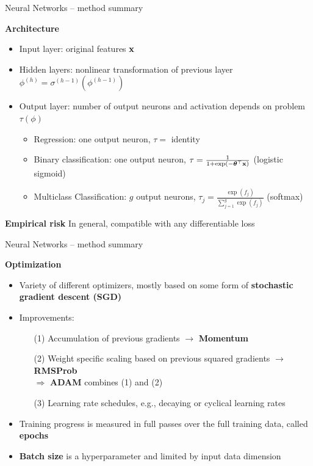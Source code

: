 \documentclass[11pt,compress,t,notes=noshow, xcolor=table]{beamer}
\newcommand{\highlight}[1]{\textcolor{hlcol}{\textbf{#1}}}
\begin{document}
\begin{frame2}{Neural Networks -- method summary}

  \footnotesize

  \highlight{Architecture}
  
  \begin{itemize}
      \item Input layer: original features $\mathbf{x}$
      \item Hidden layers: nonlinear transformation of previous layer $\phi^{(h)} = \sigma^{(h - 1)}(\phi^{(h-1)})$
      \item Output layer: number of output neurons and activation depends on problem $\tau(\phi)$
      \begin{itemize}
      \item Regression: one output neuron, $\tau = $ identity
      \item Binary classification: one output neuron, $\tau = \frac{1}{1 + \exp(- \bm{\theta}^\top \mathbf{x})}$ (logistic sigmoid)
      \item Multiclass Classification: $g$ output neurons, $\tau_j = \frac{\exp(f_j)}{\sum_{j=1}^g \exp(f_j)}$ (softmax)
  \end{itemize}
  \end{itemize}
  
  
  \highlight{Empirical risk} In general, compatible with any differentiable loss
  
  \medskip

\end{frame2}

\begin{frame2}{Neural Networks -- method summary}
  
  \highlight{Optimization}
  
  \begin{itemize}
    \item Variety of different optimizers, mostly based on some form of 
    \textbf{stochastic gradient descent (SGD)}\\
    \item Improvements: 
      \begin{itemize}
          \item[(1)] Accumulation of previous gradients $\rightarrow$ \textbf{Momentum}
          \item[(2)] Weight specific scaling based on previous squared gradients $\rightarrow$ \textbf{RMSProb}\\
          $\Rightarrow$ \textbf{ADAM} combines (1) and (2) 
          \item[(3)] Learning rate schedules, e.g., decaying or cyclical learning rates
      \end{itemize}
      \item Training progress is measured in full passes over the full training data, called \textbf{epochs}
      \item \textbf{Batch size} is a hyperparameter and limited by input data dimension
  \end{itemize}

\end{frame2}
\end{document}
